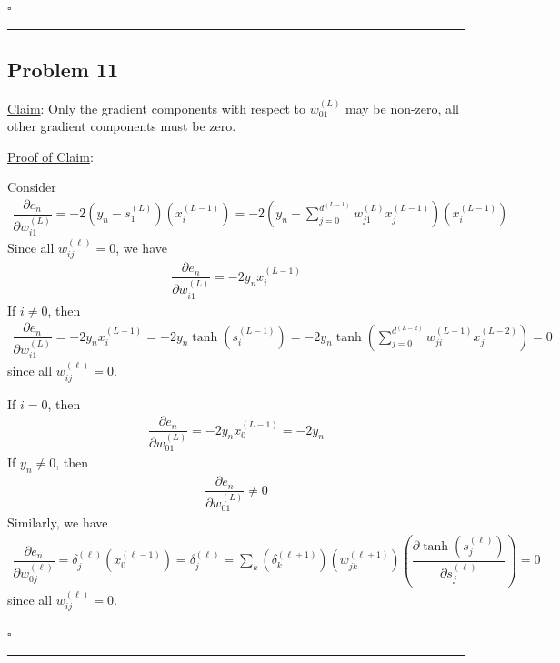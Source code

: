 \documentclass[12pt]{article}
\newcommand*{\QEDB}{\hfill\ensuremath{\square}}
\newcommand{\ParTh}[1]{\left(#1\right)}
\newcommand{\horrule}[1]{\rule{\linewidth}{#1}}
\begin{document}
\QEDB

\horrule{0.5pt}

\subsection*{Problem 11}

\underline{Claim}: Only the gradient components with respect to $w^{\ParTh{L}}_{01}$ may be non-zero, all other gradient components must be zero.

\underline{Proof of Claim}:

Consider
\begin{align}
\dfrac{\partial e_n}{\partial w^{\ParTh{L}}_{i1}}=-2\ParTh{y_n-s^{\ParTh{L}}_1}\ParTh{x^{\ParTh{L-1}}_i}=-2\ParTh{y_n-\sum_{j=0}^{d^{\ParTh{L-1}}}w^{\ParTh{L}}_{j1}x^{\ParTh{L-1}}_j}\ParTh{x^{\ParTh{L-1}}_i}
\end{align}
Since all $w^{\ParTh{\ell}}_{ij}=0$, we have
\begin{align}
\dfrac{\partial e_n}{\partial w^{\ParTh{L}}_{i1}}=-2y_nx^{\ParTh{L-1}}_i%
\end{align}
If $i\neq0$, then
\begin{align}
\dfrac{\partial e_n}{\partial w^{\ParTh{L}}_{i1}}=-2y_nx^{\ParTh{L-1}}_i=-2y_n\tanh\ParTh{s^{\ParTh{L-1}}_i}=-2y_n\tanh\ParTh{\sum_{j=0}^{d^{\ParTh{L-2}}}w^{\ParTh{L-1}}_{ji}x^{\ParTh{L-2}}_j}=0
\end{align}
since all $w^{\ParTh{\ell}}_{ij}=0$.

If $i=0$, then
\begin{align}
\dfrac{\partial e_n}{\partial w^{\ParTh{L}}_{01}}=-2y_nx^{\ParTh{L-1}}_0=-2y_n
\end{align}
If $y_n\neq0$, then
\begin{align}
\dfrac{\partial e_n}{\partial w^{\ParTh{L}}_{01}}\neq0
\end{align}
Similarly, we have
\begin{align}
\dfrac{\partial e_n}{\partial w^{\ParTh{\ell}}_{0j}}=\delta^{\ParTh{\ell}}_j\ParTh{x^{\ParTh{\ell-1}}_0}=\delta^{\ParTh{\ell}}_j=\sum_{k}\ParTh{\delta^{\ParTh{\ell+1}}_k}\ParTh{w^{\ParTh{\ell+1}}_{jk}}\ParTh{\dfrac{\partial\tanh\ParTh{s^{\ParTh{\ell}}_j}}{\partial s^{\ParTh{\ell}}_j}}=0
\end{align}
since all $w^{\ParTh{\ell}}_{ij}=0$.

\QEDB

\horrule{0.5pt}
\end{document}
